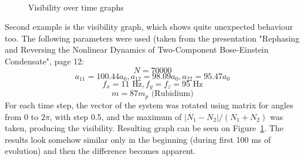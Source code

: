 \documentclass[12pt,notitlepage]{report}
\begin{document}
\begin{figure}
\begin{center}
\\
\end{center}
\caption{Visibility over time graphs}
\label{visibility}
\end{figure}

Second example is the visibility graph, which shows quite unexpected behaviour too. The following parameters were used (taken from the presentation "Rephasing and Reversing the Nonlinear Dynamics of Two-Component Bose-Einstein Condensate", page 12:
\[ N = 70000 \]
\[ a_{11} = 100.44 a_0, a_{12} = 98.09 a_0, a_{22} = 95.47 a_0 \]
\[ f_x = 11 \textrm{ Hz}, f_y = f_z = 95 \textrm{ Hz} \]
\[ m = 87 m_p \textrm{ (Rubidium)}\]
For each time step, the vector of the system was rotated using matrix for angles from 0 to $2\pi$, with step 0.5, and the maximum of $\vert N_1 - N_2 \vert / (N_1 + N_2)$ was taken, producing the visibility. Resulting graph can be seen on Figure~\ref{visibility}. The results look somehow similar only in the beginning (during first 100 ms of evolution) and then the difference becomes apparent.
\end{document}
